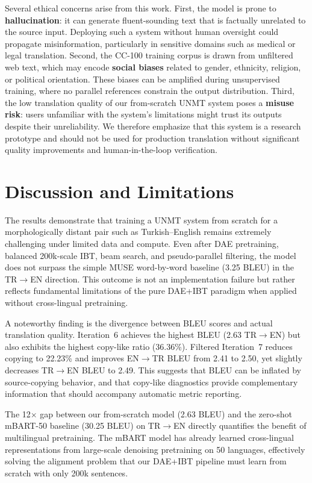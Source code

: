 \documentclass[runningheads]{llncs}
\begin{document}
Several ethical concerns arise from this work. First, the model is prone to \textbf{hallucination}: it can generate fluent-sounding text that is factually unrelated to the source input. Deploying such a system without human oversight could propagate misinformation, particularly in sensitive domains such as medical or legal translation. Second, the CC-100 training corpus is drawn from unfiltered web text, which may encode \textbf{social biases} related to gender, ethnicity, religion, or political orientation. These biases can be amplified during unsupervised training, where no parallel references constrain the output distribution. Third, the low translation quality of our from-scratch UNMT system poses a \textbf{misuse risk}: users unfamiliar with the system's limitations might trust its outputs despite their unreliability. We therefore emphasize that this system is a research prototype and should not be used for production translation without significant quality improvements and human-in-the-loop verification.

\section{Discussion and Limitations}

The results demonstrate that training a UNMT system from scratch for a morphologically distant pair such as Turkish--English remains extremely challenging under limited data and compute. Even after DAE pretraining, balanced 200k-scale IBT, beam search, and pseudo-parallel filtering, the model does not surpass the simple MUSE word-by-word baseline (3.25 BLEU) in the TR$\rightarrow$EN direction. This outcome is not an implementation failure but rather reflects fundamental limitations of the pure DAE+IBT paradigm when applied without cross-lingual pretraining.

A noteworthy finding is the divergence between BLEU scores and actual translation quality. Iteration~6 achieves the highest BLEU (2.63 TR$\rightarrow$EN) but also exhibits the highest copy-like ratio (36.36\%). Filtered Iteration~7 reduces copying to 22.23\% and improves EN$\rightarrow$TR BLEU from 2.41 to 2.50, yet slightly decreases TR$\rightarrow$EN BLEU to 2.49. This suggests that BLEU can be inflated by source-copying behavior, and that copy-like diagnostics provide complementary information that should accompany automatic metric reporting.

The 12$\times$ gap between our from-scratch model (2.63 BLEU) and the zero-shot mBART-50 baseline (30.25 BLEU) on TR$\rightarrow$EN directly quantifies the benefit of multilingual pretraining. The mBART model has already learned cross-lingual representations from large-scale denoising pretraining on 50 languages, effectively solving the alignment problem that our DAE+IBT pipeline must learn from scratch with only 200k sentences.
\end{document}
